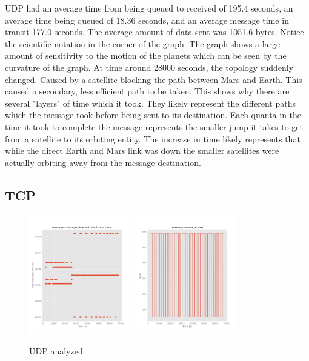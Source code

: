 \documentclass[a4paper,12pt]{article}
\begin{document}
UDP had an average time from being queued to received of
195.4 seconds, an average time being queued of
18.36 seconds, and an average message time in transit
177.0 seconds. The average amount of data sent was 
1051.6 bytes. Notice the scientific notation in the 
corner of the graph. The graph shows a large amount of 
sensitivity to the motion of the planets which can be 
seen by the curvature of the graph. At time around 28000
seconds, the topology suddenly changed. Caused by a satellite
blocking the path between Mars and Earth. This caused a secondary, 
less efficient path to be taken. This shows why there are several 
"layers" of time which it took. They likely represent the different paths 
which the message took before being sent to its destination. Each quanta in
the time it took to complete the message 
represents the smaller jump it takes to get from a satellite to its 
orbiting entity. The increase in time likely represents that while the 
direct Earth and Mars link was down the smaller satellites were actually orbiting 
away from the message destination.

\subsection{TCP}

\begin{figure}[h]
  \centering
  \includegraphics[width=0.4\textwidth]{media/tcp.png}
  \includegraphics[width=0.4\textwidth]{media/tcp_data.png}
  \caption{UDP analyzed}
\end{figure}



\printbibliography
\end{document}
